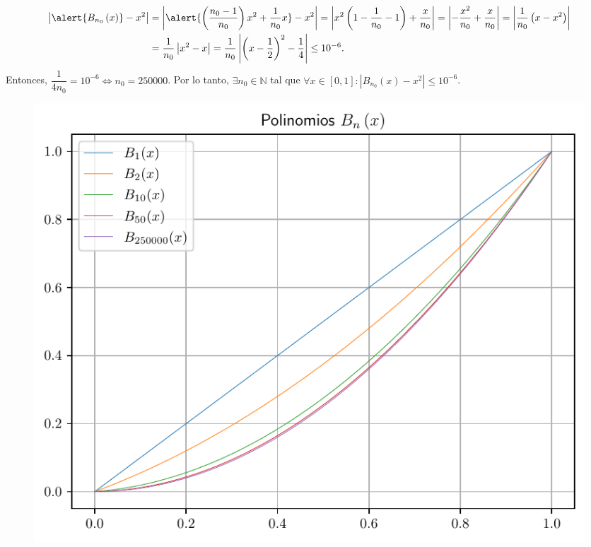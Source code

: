 \begin{frame}
\begin{solution}
		\begin{align*}
			\left|
			\alert{
				B_{n_{0}}\left(x\right)
			}
			-x^{2}
			\right| & =
			\left|
			\alert{
			\left(\dfrac{n_{0}-1}{n_{0}}\right)x^{2}+
			\dfrac{1}{n_{0}}x
			}
			-x^{2}
			\right|=
			\left|
			x^{2}\left(1-\dfrac{1}{n_{0}}-1\right)+\dfrac{x}{n_{0}}
			\right|=
			\left|
			-\dfrac{x^{2}}{n_{0}}+\dfrac{x}{n_{0}}
			\right|
			=\left|
			\dfrac{1}{n_{0}}
			\left(x-x^{2}\right)
			\right|     \\
			        & =
			\dfrac{1}{n_{0}}
			\left|
			x^{2}-x
			\right|=
			\dfrac{1}{n_{0}}
			\left|
			{\left(x-\dfrac{1}{2}\right)}^{2}-
			\dfrac{1}{4}
			\right|\leq
			10^{-6}.
		\end{align*}
		Entonces,
		\begin{math}
			\dfrac{1}{4n_{0}}=10^{-6}\iff n_{0}=250000
		\end{math}.
		Por lo tanto,
		\begin{math}
			\exists n_{0}\in\mathbb{N}
		\end{math}
		tal que
		\begin{math}
			\forall x\in\left[0,1\right]:
			\left|B_{n_{0}}\left(x\right)-x^{2}\right|\leq
			10^{-6}
		\end{math}.
	\end{solution}
\end{frame}

\begin{frame}
	\begin{solution}
		\begin{figure}[ht!]
			\centering
			\includegraphics[width=.72\paperwidth]{p4}
		\end{figure}
	\end{solution}
\end{frame}
